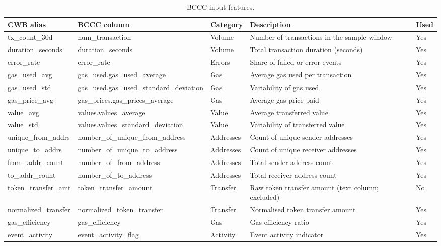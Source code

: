 \begin{table}[H]
\centering
\caption[BCCC input features]{BCCC input features.}
\label{tab:bccc-dataset-features}
\footnotesize
\begin{tabular}{@{}p{2.4cm}p{3.6cm}p{2.0cm}p{4.8cm}p{1.0cm}@{}}
\toprule
\tableheadcolor
\textbf{CWB alias} & \textbf{BCCC column} & \textbf{Category} & \textbf{Description} & \textbf{Used} \\
\midrule
tx\_count\_30d & num\_transaction & Volume & Number of transactions in the sample window & Yes \\
duration\_seconds & duration\_seconds & Volume & Total transaction duration (seconds) & Yes \\
error\_rate & error\_rate & Errors & Share of failed or error events & Yes \\
gas\_used\_avg & gas\_used.gas\_used\_average & Gas & Average gas used per transaction & Yes \\
gas\_used\_std & gas\_used.gas\_used\_standard\_deviation & Gas & Variability of gas used & Yes \\
gas\_price\_avg & gas\_prices.gas\_prices\_average & Gas & Average gas price paid & Yes \\
value\_avg & values.values\_average & Value & Average transferred value & Yes \\
value\_std & values.values\_standard\_deviation & Value & Variability of transferred value & Yes \\
unique\_from\_addrs & number\_of\_unique\_from\_address & Addresses & Count of unique sender addresses & Yes \\
unique\_to\_addrs & number\_of\_unique\_to\_address & Addresses & Count of unique receiver addresses & Yes \\
from\_addr\_count & number\_of\_from\_address & Addresses & Total sender address count & Yes \\
to\_addr\_count & number\_of\_to\_address & Addresses & Total receiver address count & Yes \\
token\_transfer\_amt & token\_transfer\_amount & Transfer & Raw token transfer amount (text column; excluded) & No \\
normalized\_transfer & normalized\_token\_transfer & Transfer & Normalised token transfer amount & Yes \\
gas\_efficiency & gas\_efficiency & Gas & Gas efficiency ratio & Yes \\
event\_activity & event\_activity\_flag & Activity & Event activity indicator & Yes \\

\end{tabular}
\end{table}
